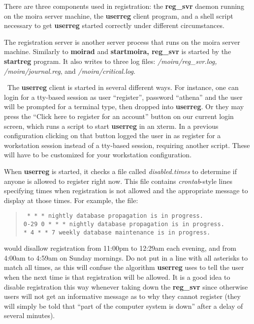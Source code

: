 \documentclass{book}
\begin{document}
There are three components used in registration: the {\bf reg\_svr}
daemon running on the moira server machine, the {\bf userreg} client
program, and a shell script necessary to get {\bf userreg} started
correctly under different circumstances. 

The registration server is another server process that runs on the
moira server machine.  Similarly to {\bf moirad} and {\bf startmoira,
reg\_svr} is started by the {\bf startreg} program.  It also writes to
three log files: {\it /moira/reg\_svr.log, /moira/journal.reg}, and
{\it /moira/critical.log}.

\athena\ The {\bf userreg} client is started in several different
ways.  For instance, one can login for a tty-based session as user
``register'', password ``athena'' and the user will be prompted for a
terminal type, then dropped into {\bf userreg}.  Or they may press the
``Click here to register for an account'' button on our current login
screen, which runs a script to start {\bf userreg} in an xterm.  In a
previous configuration clicking on that button logged the user in as
register for a workstation session instead of a tty-based session,
requiring another script.  These will have to be customized for your
workstation configuration.

When {\bf userreg} is started, it checks a file called
{\em disabled.times} to determine if anyone is allowed to register right
now.  This file contains {\em crontab}-style lines specifying times when
registration is not allowed and the appropriate message to display at
those times.  For example, the file:
\begin{quotation}\tt
{} * * *	nightly database propagation is in progress.\\
0-29 0 * * *	nightly database propagation is in progress.\\
* 4 * * 7	weekly database maintenance is in progress.
\end{quotation}
would disallow registration from 11:00pm to 12:29am each evening, and
from 4:00am to 4:59am on Sunday mornings.  Do not put in a line with
all asterisks to match all times, as this will confuse the algorithm
{\bf userreg} uses to tell the user when the next time is that
registration will be allowed.  It is a good idea to disable
registration this way whenever taking down the {\bf reg\_svr} since
otherwise users will not get an informative message as to why they
cannot register (they will simply be told that ``part of the computer
system is down'' after a delay of several minutes).
\end{document}
